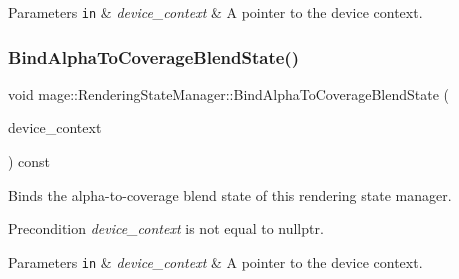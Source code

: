 \begin{DoxyParams}[1]{Parameters}
\mbox{\tt in}  & {\em device\+\_\+context} & A pointer to the device context. \\
\hline
\end{DoxyParams}
\hypertarget{classmage_1_1_rendering_state_manager_a76139a85b64c1d83e64237cf15645da4}{}\label{classmage_1_1_rendering_state_manager_a76139a85b64c1d83e64237cf15645da4} 
\subsubsection{\texorpdfstring{Bind\+Alpha\+To\+Coverage\+Blend\+State()}{BindAlphaToCoverageBlendState()}}
{\footnotesize\ttfamily void mage\+::\+Rendering\+State\+Manager\+::\+Bind\+Alpha\+To\+Coverage\+Blend\+State (\begin{DoxyParamCaption}\item[{I\+D3\+D11\+Device\+Context2 $\ast$}]{device\+\_\+context }\end{DoxyParamCaption}) const\hspace{0.3cm}{\ttfamily [noexcept]}}

Binds the alpha-\/to-\/coverage blend state of this rendering state manager.

\begin{DoxyPrecond}{Precondition}
{\itshape device\+\_\+context} is not equal to {\ttfamily nullptr}. 
\end{DoxyPrecond}

\begin{DoxyParams}[1]{Parameters}
\mbox{\tt in}  & {\em device\+\_\+context} & A pointer to the device context. \\
\hline
\end{DoxyParams}
\hypertarget{classmage_1_1_rendering_state_manager_a06d7cd55216985100c3a55deba7dfae2}{}\label{classmage_1_1_rendering_state_manager_a06d7cd55216985100c3a55deba7dfae2} 
